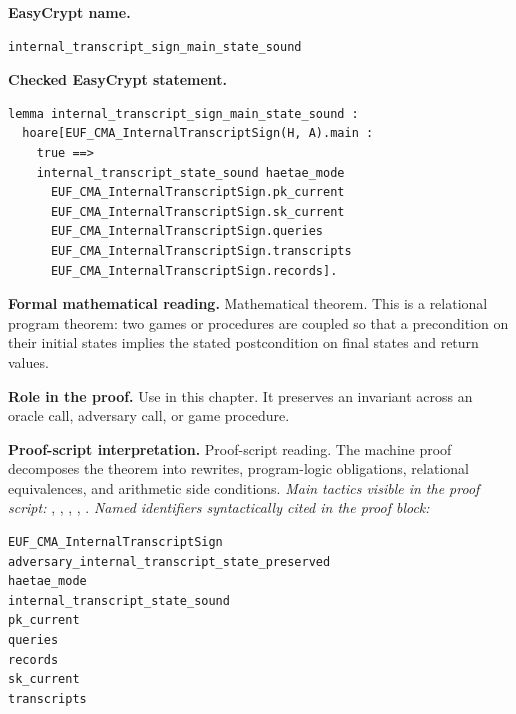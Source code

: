 \begin{formaltheorem}
\noindent\textbf{EasyCrypt name.}
\begin{lstlisting}[language=EasyCrypt,basicstyle=\ttfamily\scriptsize]
internal_transcript_sign_main_state_sound
\end{lstlisting}
\noindent\textbf{Checked EasyCrypt statement.}
\begin{lstlisting}[language=EasyCrypt,basicstyle=\ttfamily\scriptsize]
lemma internal_transcript_sign_main_state_sound :
  hoare[EUF_CMA_InternalTranscriptSign(H, A).main :
    true ==>
    internal_transcript_state_sound haetae_mode
      EUF_CMA_InternalTranscriptSign.pk_current
      EUF_CMA_InternalTranscriptSign.sk_current
      EUF_CMA_InternalTranscriptSign.queries
      EUF_CMA_InternalTranscriptSign.transcripts
      EUF_CMA_InternalTranscriptSign.records].
\end{lstlisting}
\noindent\textbf{Formal mathematical reading.}
Mathematical theorem. This is a relational program theorem: two games or procedures are coupled so that a precondition on their initial states implies the stated postcondition on final states and return values.

\noindent\textbf{Role in the proof.}
Use in this chapter. It preserves an invariant across an oracle call, adversary call, or game procedure.

\noindent\textbf{Proof-script interpretation.}
Proof-script reading. The machine proof decomposes the theorem into rewrites, program-logic obligations, relational equivalences, and arithmetic side conditions.
\emph{Main tactics visible in the proof script:} , , , , .
\emph{Named identifiers syntactically cited in the proof block:}
\begin{lstlisting}[language=EasyCrypt,basicstyle=\ttfamily\scriptsize]
EUF_CMA_InternalTranscriptSign
adversary_internal_transcript_state_preserved
haetae_mode
internal_transcript_state_sound
pk_current
queries
records
sk_current
transcripts
\end{lstlisting}

\end{formaltheorem}

